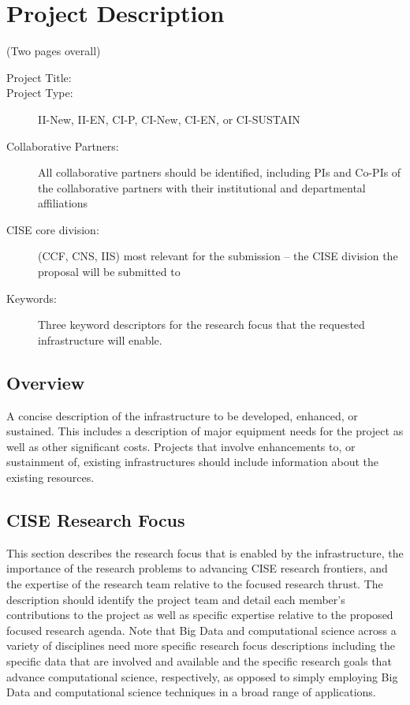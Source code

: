 
\section{Project Description}

(Two pages overall)

\begin{description}
  \item[Project Title:]
  \item[Project Type:] II-New, II-EN, CI-P, CI-New, CI-EN, or CI-SUSTAIN
  \item[Collaborative Partners:] All collaborative partners should be identified, including PIs and Co-PIs of the collaborative partners with their institutional and departmental affiliations
  \item[CISE core division:] (CCF, CNS, IIS) most relevant for the submission – the CISE division the proposal will be submitted to
  \item[Keywords:] Three keyword descriptors for the research focus that the requested infrastructure will enable.
\end{description}


\subsection{Overview}
A concise description of the infrastructure to be developed, enhanced, or
sustained. This includes a description of major equipment needs for the 
project as well as other significant costs. Projects that involve 
enhancements to, or sustainment of, existing infrastructures should 
include information about the existing resources.

\subsection{CISE Research Focus}
This section describes the research focus that is enabled by the 
infrastructure, the importance of the research problems to advancing 
CISE research frontiers, and the expertise of the research team relative 
to the focused research thrust. The description should identify the 
project team and detail each member’s contributions to the project as 
well as specific expertise relative to the proposed focused research 
agenda. Note that Big Data and computational science across a variety of 
disciplines need more specific research focus descriptions including the 
specific data that are involved and available and the specific research 
goals that advance computational science, respectively, as opposed to 
simply employing Big Data and computational science techniques in a broad 
range of applications.


